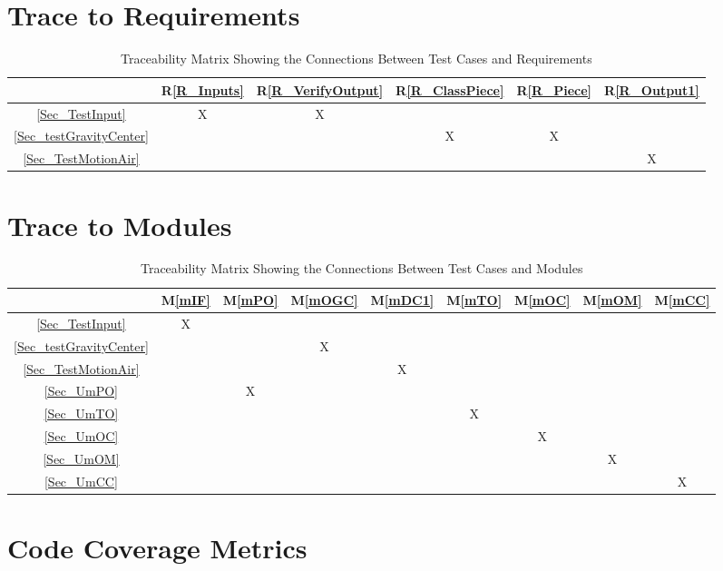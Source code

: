 \documentclass[12pt, titlepage]{article}
\newcommand{\rref}[1]{R\ref{#1}}
\newcommand{\mref}[1]{M\ref{#1}}
\begin{document}
\section{Trace to Requirements}

\newpage
\begin{table}[h!]
	\centering
	\begin{tabular}{|c|c|c|c|c|c|}
		\hline
		& \rref{R_Inputs} & \rref{R_VerifyOutput} & \rref{R_ClassPiece}& \rref{R_Piece} &\rref{R_Output1}\\
		\hline
		\ref{Sec_TestInput}&X &X & & & \\ \hline
		\ref{Sec_testGravityCenter} & & &X &X &\\ \hline
		\ref{Sec_TestMotionAir} & & & & &X\\ \hline
	\end{tabular}
	\caption{Traceability Matrix Showing the Connections Between Test Cases and Requirements}
	\label{Table:inputTest2}
\end{table}
		
\section{Trace to Modules}		

\begin{table}[h!]
	\centering
	\begin{tabular}{|c|c|c|c|c|c|c|c|c|}
		\hline
		& \mref{mIF} & \mref{mPO} & \mref{mOGC}& \mref{mDC1} &\mref{mTO} &\mref{mOC}&\mref{mOM}&\mref{mCC}\\
		\hline
		\ref{Sec_TestInput}&X & & & & & & &\\ \hline
		\ref{Sec_testGravityCenter} & & &X & & & & &\\ \hline
		\ref{Sec_TestMotionAir} & & & &X & & & &\\ \hline
		\ref{Sec_UmPO} & &X & & & & & &\\ \hline
		\ref{Sec_UmTO} & & & & &X & & &\\ \hline
		\ref{Sec_UmOC} & & & & & &X & &\\ \hline
		\ref{Sec_UmOM} & & & & & & &X &\\ \hline
		\ref{Sec_UmCC} & & & & & & & &X\\ \hline
	\end{tabular}
	\caption{Traceability Matrix Showing the Connections Between Test Cases and Modules}
	\label{Table:inputTest3}
\end{table}

\section{Code Coverage Metrics}




\end{document}
